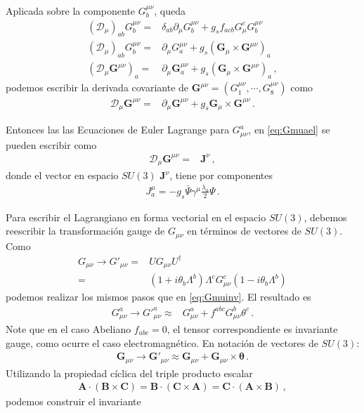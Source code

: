 Aplicada sobre la componente $G^{\mu\nu}_b$, queda
\begin{align}
 \left(\mathcal{D}_\mu\right)_{ab}G^{\mu\nu}_b  =&\delta_{ab}\partial_\mu G^{\mu\nu}_b+g_s f_{acb}G_\mu^cG^{\mu\nu}_b\nonumber\\
 \left(\mathcal{D}_\mu\right)_{ab}G^{\mu\nu}_b  =&\partial_\mu G^{\mu\nu}_a+g_s \left(\mathbf{G}_\mu\times \mathbf{G}^{\mu\nu}\right)_a\nonumber\\
 \left(\mathcal{D}_\mu\mathbf{G}^{\mu\nu}\right)_a  =&\partial_\mu\mathbf{G}^{\mu\nu}_a+g_s \left(\mathbf{G}_\mu\times \mathbf{G}^{\mu\nu}\right)_a\,,
\end{align}
podemos escribir la derivada covariante de $\mathbf{G}^{\mu\nu}=\left(G^{\mu\nu}_1,\cdots,G^{\mu\nu}_8\right)$ como
\begin{align}
  \mathcal{D}_\mu \mathbf{G}^{\mu\nu}=&\partial_\mu\mathbf{G}^{\mu\nu}+g_s \mathbf{G}_\mu\times \mathbf{G}^{\mu\nu}\,.
\end{align}


Entonces las las Ecuaciones de Euler Lagrange para $G_{\mu\nu}^a$, en \eqref{eq:Gmuael} se pueden escribir como
\begin{align}
  \mathcal{D}_\mu \mathbf{G}^{\mu\nu}=&\mathbf{J}^\nu\,,
\end{align}
donde el vector en espacio $SU(3)$ $\mathbf{J}^\nu$, tiene por componentes
  \begin{align}
J^\mu_a = -g_s\bar{\Psi}\gamma^\mu\frac{\lambda_a}{2}\Psi\,.
\end{align}

Para escribir el Lagrangiano en forma vectorial en el espacio $SU(3)$, debemos reescribir la transformación gauge de $G_{\mu\nu}$ en términos de vectores de $SU(3)$. Como
\begin{align}
  {G}_{\mu\nu}\to{G}'_{\mu\nu}=&U G_{\mu\nu} U^{\dagger}\nonumber\\
  =&(1+i\theta_b\Lambda^b)\Lambda^cG^c_{\mu\nu}(1-i\theta_b\Lambda^b)
\end{align}
podemos realizar los mismos pasos que en \eqref{eq:Gmuinv}. El resultado es
\begin{align}
    G_{\mu\nu}^a\to {G'}_{\mu\nu}^a\approx&G_{\mu\nu}^a+f^{abc}G_{\mu\nu}^b\theta^c\,.
\end{align}
Note que en el caso Abeliano $f_{abc}=0$, el tensor correspondiente es invariante gauge, como ocurre el caso electromagnético. En notación de vectores de $SU(3)$:
\begin{align}
  \mathbf{G}_{\mu\nu}\to\mathbf{G}'_{\mu\nu}\approx\mathbf{G}_{\mu\nu}+\mathbf{G}_{\mu\nu}\times \boldsymbol{\theta}\,.
\end{align}
Utilizando la propiedad cíclica del triple producto escalar
\begin{align}
  \mathbf{A}\cdot(\mathbf{B}\times \mathbf{C})=\mathbf{B}\cdot(\mathbf{C}\times \mathbf{A})=\mathbf{C}\cdot(\mathbf{A}\times \mathbf{B})\,,
\end{align}
podemos construir el invariante

